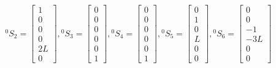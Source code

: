 \documentclass[onecolumn,oneside]{SUSTechHomework}
\begin{document}
  \[
    {}^0S_2 = \begin{bmatrix}
        1 \\ 0 \\ 0 \\ 0 \\ 2L \\ 0
    \end{bmatrix},
    {}^0S_3 = \begin{bmatrix}
      0 \\ 0 \\ 0 \\ 0 \\ 0 \\ 1
    \end{bmatrix},
    {}^0S_4 = \begin{bmatrix}
      0 \\ 0 \\ 0 \\ 0 \\ 0 \\ 1
    \end{bmatrix},
    {}^0S_5 = \begin{bmatrix}
    0 \\ 1 \\ 0 \\ L \\ 0 \\ 0
    \end{bmatrix},
    {}^0S_6 = \begin{bmatrix}
    0 \\ 0 \\ -1 \\ -3L \\ 0 \\ 0
    \end{bmatrix}
  \]
\end{document}
